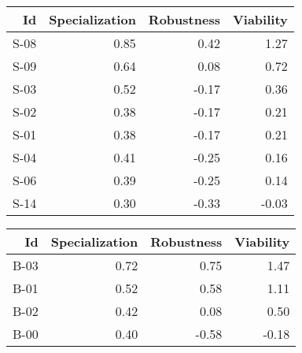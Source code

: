 


\begin{tabular}{ | r | r | r | r | }
    \hline
                    Id  &  Specialization  &      Robustness  &       Viability  \\
    \hline
    \hline
                  S-08  &            0.85  &            0.42  &            1.27  \\
    \hline
                  S-09  &            0.64  &            0.08  &            0.72  \\
    \hline
                  S-03  &            0.52  &           -0.17  &            0.36  \\
    \hline
                  S-02  &            0.38  &           -0.17  &            0.21  \\
    \hline
                  S-01  &            0.38  &           -0.17  &            0.21  \\
    \hline
                  S-04  &            0.41  &           -0.25  &            0.16  \\
    \hline
                  S-06  &            0.39  &           -0.25  &            0.14  \\
    \hline
                  S-14  &            0.30  &           -0.33  &           -0.03  \\
    \hline
\end{tabular}


\begin{tabular}{ | r | r | r | r | }
    \hline
                    Id  &  Specialization  &      Robustness  &       Viability  \\
    \hline
    \hline
                  B-03  &            0.72  &            0.75  &            1.47  \\
    \hline
                  B-01  &            0.52  &            0.58  &            1.11  \\
    \hline
                  B-02  &            0.42  &            0.08  &            0.50  \\
    \hline
                  B-00  &            0.40  &           -0.58  &           -0.18  \\
    \hline
\end{tabular}


